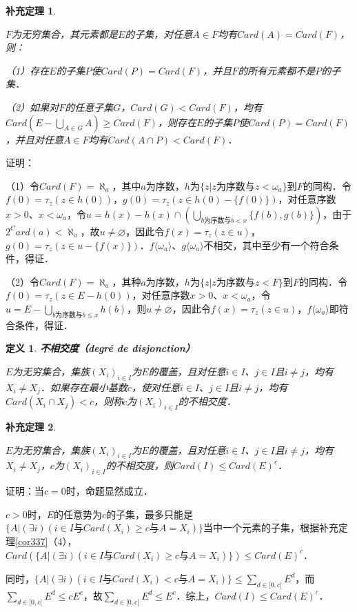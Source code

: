 \documentclass[12pt, a4paper, oneside]{book}
\newtheorem{cor}{补充定理}
\newtheorem{de}{定义}
\begin{document}
			\begin{cor}\label{cor406}
				\hfill\par
				$F$为无穷集合，其元素都是$E$的子集，对任意$A\in F$均有$Card(A)=Card(F)$，则：
				\par
				（1）存在$E$的子集$P$使$Card(P)=Card(F)$，并且$F$的所有元素都不是$P$的子集．
				\par
				（2）如果对$F$的任意子集$G$，$Card(G)<Card(F)$，均有$Card(E-\bigcup\limits_{A\in G}A)\geq Card(F)$，则存在$E$的子集$P$使$Card(P)=Card(F)$，并且对任意$A\in F$均有$Card(A\cap P)<Card(F)$．
			\end{cor}
			证明：
			\par
			（1）令$Card(F)=\aleph_a$，其中$a$为序数，$h$为$\{z|z\text{为序数}\text{与}z<\omega_a\}$到$F$的同构．令$f(0)=\tau_z(z\in h(0))$，$g(0)=\tau_z(z\in h(0)-\{f(0)\})$，对任意序数$x>0$、$x<\omega_a$，令$u=h(x)-h(x)\cap(\bigcup\limits_{b\text{为序数}\text{与}b<x}\{f(b), g(b)\})$，由于$2^Card(a)< \aleph_a$，故$u\neq \varnothing$，因此令$f(x)=\tau_z(z\in u)$，$g(0)=\tau_z(z\in u-\{f(x)\})$．$f\langle\omega_a\rangle$、$g\langle\omega_a\rangle$不相交，其中至少有一个符合条件，得证．
			\par
			（2）令$Card(F)=\aleph_a$，其种$a$为序数，$h$为$\{z|z\text{为序数}\text{与}z<F\}$到$F$的同构．令$f(0)=\tau_z(z\in E-h(0))$，对任意序数$x>0$、$x<\omega_a$，令$u=E-\bigcup\limits_{b\text{为序数}\text{与}b\leq x}h(b)$，则$u\neq \varnothing$，因此令$f(x)=\tau_z(z\in u)$，$f\langle\omega_a\rangle$即符合条件，得证．
			
			\begin{de}
				\textbf{不相交度（degré de disjonction）}
				\par
				$E$为无穷集合，集族$(X_i)_{i\in I}$为$E$的覆盖，且对任意$i\in I$、$j\in I$且$i\neq j$，均有$X_i\neq X_j$．如果存在最小基数$c$，使对任意$i\in I$、$j\in I$且$i\neq j$，均有$Card(X_i\cap X_j)<c$，则称$c$为$(X_i)_{i\in I}$的不相交度．
			\end{de}
			
			\begin{cor}\label{cor407}
				\hfill\par
				$E$为无穷集合，集族$(X_i)_{i\in I}$为$E$的覆盖，且对任意$i\in I$、$j\in I$且$i\neq j$，均有$X_i\neq X_j$，$c$为$(X_i)_{i\in I}$的不相交度，则$Card(I)\leq Card(E)^c$．
			\end{cor}
			证明：当$c=0$时，命题显然成立．
			\par
			$c>0$时，$E$的任意势为$c$的子集，最多只能是$\{A|(\exists i)(i\in I\text{与}Card(X_i)\geq c\text{与}A=X_i)\}$当中一个元素的子集，根据补充定理\ref{cor337}（4），$Card(\{A|(\exists i)(i\in I\text{与}Card(X_i)\geq c\text{与}A=X_i)\})\leq Card(E)^c$．
			\par
			同时，$\{A|(\exists i)(i\in I\text{与}Card(X_i)<c\text{与}A=X_i)\}\leq \sum\limits_{d\in [0, c[}E^d$，而$\sum\limits_{d\in [0, c[}E^d\leq cE^c$，故$\sum\limits_{d\in [0, c[}E^d\leq E^c$．综上，$Card(I)\leq Card(E)^c$．			
\end{document}
